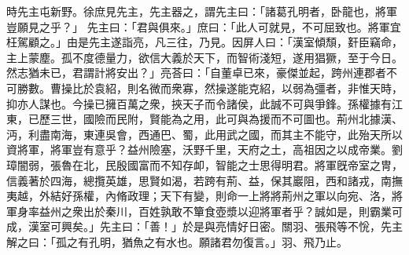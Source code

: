 \begin{pinyinscope}
 
時先主屯新野。徐庶見先主，先主器之，謂先主曰：「諸葛孔明者，卧龍也，將軍豈願見之乎？」
 先主曰：「君與俱來。」庶曰：「此人可就見，不可屈致也。將軍宜枉駕顧之。」由是先主遂詣亮，凡三往，乃見。因屏人曰：「漢室傾頹，姧臣竊命，主上蒙塵。孤不度德量力，欲信大義於天下，而智術淺短，遂用猖獗，至于今日。然志猶未已，君謂計將安出？」亮荅曰：「自董卓已來，豪傑並起，跨州連郡者不可勝數。曹操比於袁紹，則名微而衆寡，然操遂能克紹，以弱為彊者，非惟天時，抑亦人謀也。今操已擁百萬之衆，挾天子而令諸侯，此誠不可與爭鋒。孫權據有江東，已歷三世，國險而民附，賢能為之用，此可與為援而不可圖也。荊州北據漢、沔，利盡南海，東連吳會，西通巴、蜀，此用武之國，而其主不能守，此殆天所以資將軍，將軍豈有意乎？益州險塞，沃野千里，天府之土，高祖因之以成帝業。劉璋闇弱，張魯在北，民殷國富而不知存卹，智能之士思得明君。將軍旣帝室之冑，信義著於四海，總攬英雄，思賢如渴，若跨有荊、益，保其巖阻，西和諸戎，南撫夷越，外結好孫權，內脩政理；天下有變，則命一上將將荊州之軍以向宛、洛，將軍身率益州之衆出於秦川，百姓孰敢不簞食壺漿以迎將軍者乎？誠如是，則霸業可成，漢室可興矣。」先主曰：「善！」於是與亮情好日密。關羽、張飛等不恱，先主解之曰：「孤之有孔明，猶魚之有水也。願諸君勿復言。」羽、飛乃止。
 

\end{pinyinscope}
